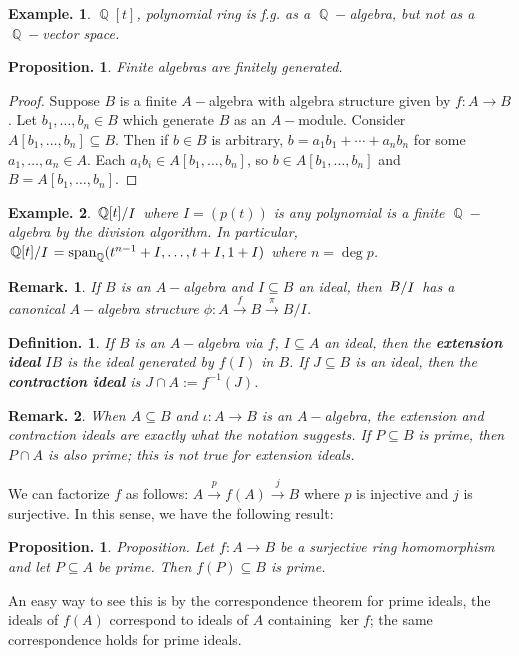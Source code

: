 \documentclass[11pt, a4paper]{memoir}
\DeclareMathOperator{\Q}{{\mathbb{Q}}}
\newcommand{\fto}[1]{\ensuremath{\xrightarrow{\scriptstyle{#1}}}}
\theoremstyle{change}
\newtheorem{proposition}[theorem]{Proposition.}
\theoremstyle{plain}
\theoremstyle{nonumberplain}
\newtheorem{definition}{Definition.}
\newtheorem{example}{Example.}
\newtheorem{remark}{Remark.}
\newtheorem{proof}{Proof}
\DeclareMathOperator{\spn}{span}
\newcommand{\quot}[2]{\mathchoice{\left.\raisebox{0.10em}{$#1$}\middle/\raisebox{-0.10em}{$#2$}\right.}
                                 {\left.\raisebox{0.04em}{$#1$}\middle/\raisebox{-0.04em}{$#2$}\right.}
                                 {\left.\raisebox{0.01em}{$#1$}\middle/\raisebox{-0.01em}{$#2$}\right.}
                                 {\left.\raisebox{0em}{$#1$}\middle/\raisebox{0em}{$#2$}\right.}}
\numberwithin{equation}{section}
\begin{document}
\begin{example}
    $\Q[t]$, polynomial ring is f.g. as a $\Q-$algebra, but not as a $\Q-$vector space.
\end{example}

\begin{proposition}
    Finite algebras are finitely generated.
\end{proposition}
\begin{proof}
    Suppose $B$ is a finite $A-$algebra with algebra structure given by $f:A\to B$.
    Let $b_1,\ldots,b_n\in B$ which generate $B$ as an $A-$module.
    Consider $A[b_1,\ldots,b_n]\subseteq B$.
    Then if $b\in B$ is arbitrary, $b=a_1b_1+\cdots+a_nb_n$ for some $a_1,\ldots,a_n\in A$.
    Each $a_ib_i\in A[b_1,\ldots,b_n]$, so $b\in A[b_1,\ldots,b_n]$ and $B=A[b_1,\ldots,b_n]$.
\end{proof}
\begin{example}
    $\quot{\Q[t]}{I}$ where $I=(p(t))$ is any polynomial is a finite $\Q-$algebra by the division algorithm.
    In particular, $\quot{\Q[t]}{I}=\spn_{\Q}(t^{n-1}+I,\ldots,t+I,1+I)$ where $n=\deg p$.
\end{example}
\begin{remark}
    If $B$ is an $A-$algebra and $I\subseteq B$ an ideal, then $\quot{B}{I}$ has a canonical $A-$algebra structure $\phi:A\fto{f} B\fto{\pi} B/I$.
\end{remark}
\begin{definition}
    If $B$ is an $A-$algebra via $f$, $I\subseteq A$ an ideal, then the \textbf{extension ideal} $IB$ is the ideal generated by $f(I)$ in $B$.
    If $J\subseteq B$ is an ideal, then the \textbf{contraction ideal} is $J\cap A:=f^{-1}(J)$.
\end{definition}
\begin{remark}
    When $A\subseteq B$ and $\iota:A\to B$ is an $A-$algebra, the extension and contraction ideals are exactly what the notation suggests.
    If $P\subseteq B$ is prime, then $P\cap A$ is also prime; this is not true for extension ideals.
\end{remark}
We can factorize $f$ as follows: $A\fto{p} f(A)\fto{j} B$ where $p$ is injective and $j$ is surjective.
In this sense, we have the following result:
\begin{proposition}
    Proposition. Let $f:A\to B$ be a surjective ring homomorphism and let $P\subseteq A$ be prime.
    Then $f(P)\subseteq B$ is prime.
\end{proposition}
An easy way to see this is by the correspondence theorem for prime ideals, the ideals of $f(A)$ correspond to ideals of $A$ containing $\ker f$; the same correspondence holds for prime ideals.
\end{document}
